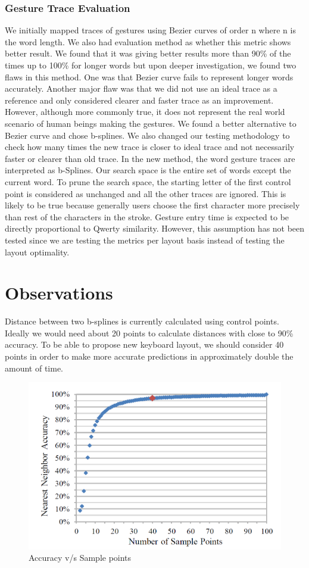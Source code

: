 \documentclass[MTech]{iitmdiss}
\begin{document}
\subsection{Gesture Trace Evaluation}
We initially mapped traces of gestures using Bezier curves of order n where n is the word length. We also had evaluation method as whether this metric shows better result. We found that it was giving better results more than 90\% of the times up to 100\% for longer words but upon deeper investigation, we found two flaws in this method. One was that Bezier curve fails to represent longer words accurately. Another major flaw was that we did not use an ideal trace as a reference and only considered clearer and faster trace as an improvement. However, although more commonly true, it does not represent the real world scenario of human beings making the gestures. We found a better alternative to Bezier curve and chose b-splines. We also changed our testing methodology to check how many times the new trace is closer to ideal trace and not necessarily faster or clearer than old trace.
In the new method, the word gesture traces are interpreted as b-Splines. Our search space is the entire set of words except the current word. To prune the search space, the starting letter of the first control point is considered as unchanged and all the other traces are ignored. This is likely to be true because generally users choose the first character more precisely than rest of the characters in the stroke. Gesture entry time is expected to be directly proportional to Qwerty similarity. However, this assumption has not been tested since we are testing the metrics per layout basis instead of testing the layout optimality.

\chapter{Observations}
Distance between two b-splines is currently calculated using control points. Ideally we would need about 20 points to calculate distances with close to 90\% accuracy. To be able to propose new keyboard layout, we should consider 40 points in order to make more accurate predictions in approximately double the amount of time.

\begin{figure}[h!]
	\centering
	\includegraphics[scale=0.5]{Images/accuracy}
	\caption{Accuracy v/s Sample points }
\end{figure}
\end{document}
